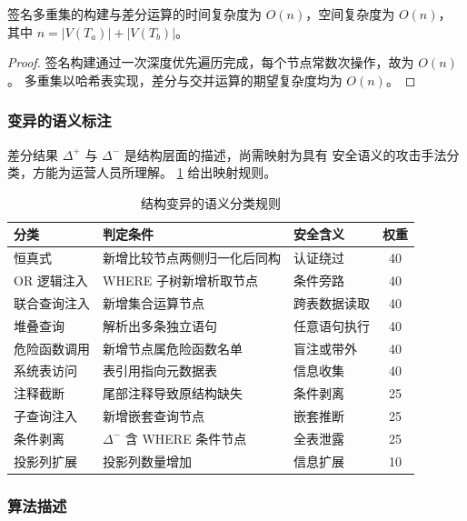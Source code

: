 \begin{proposition}[复杂度]
签名多重集的构建与差分运算的时间复杂度为 $O(n)$，空间复杂度为 $O(n)$，
其中 $n = |V(T_a)| + |V(T_b)|$。
\end{proposition}

\begin{proof}
签名构建通过一次深度优先遍历完成，每个节点常数次操作，故为 $O(n)$。
多重集以哈希表实现，差分与交并运算的期望复杂度均为 $O(n)$。
\end{proof}

\subsubsection{变异的语义标注}

差分结果 $\Delta^{+}$ 与 $\Delta^{-}$ 是结构层面的描述，尚需映射为具有
安全语义的攻击手法分类，方能为运营人员所理解。
\cref{tab:diff-kinds} 给出映射规则。

\begin{table}[htbp]
\centering
\caption{结构变异的语义分类规则}
\label{tab:diff-kinds}
\footnotesize
\begin{tabular}{@{}l p{5.0cm} l c@{}}
\toprule
\textbf{分类} & \textbf{判定条件} & \textbf{安全含义} & \textbf{权重} \\
\midrule
恒真式       & 新增比较节点两侧归一化后同构 & 认证绕过     & 40 \\
OR 逻辑注入  & WHERE 子树新增析取节点       & 条件旁路     & 40 \\
联合查询注入 & 新增集合运算节点             & 跨表数据读取 & 40 \\
堆叠查询     & 解析出多条独立语句           & 任意语句执行 & 40 \\
危险函数调用 & 新增节点属危险函数名单       & 盲注或带外   & 40 \\
系统表访问   & 表引用指向元数据表           & 信息收集     & 40 \\
注释截断     & 尾部注释导致原结构缺失       & 条件剥离     & 25 \\
子查询注入   & 新增嵌套查询节点             & 嵌套推断     & 25 \\
条件剥离     & $\Delta^{-}$ 含 WHERE 条件节点 & 全表泄露   & 25 \\
投影列扩展   & 投影列数量增加               & 信息扩展     & 10 \\
\bottomrule
\end{tabular}
\end{table}

\subsubsection{算法描述}

